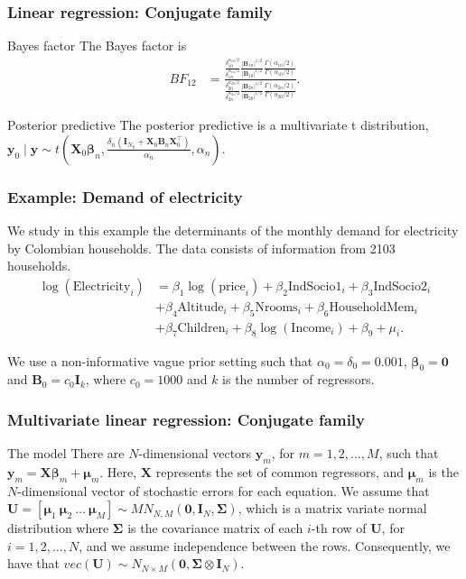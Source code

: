 \documentclass[12pt, compress]{beamer}
\begin{document}
\begin{frame}
	\frametitle{Linear regression: Conjugate family}
	\begin{block}{Bayes factor}
		The Bayes factor is
		\begin{align*}
			BF_{12}&=\frac{\frac{\delta_{10}^{\alpha_{10}/2}}{\delta_{1n}^{\alpha_{1n}/2}}\frac{|{\bm{B}}_{1n}|^{1/2}}{|{\bm{B}}_{10}|^{1/2}}\frac{\Gamma(\alpha_{1n}/2)}{\Gamma(\alpha_{10}/2)}}{\frac{\delta_{20}^{\alpha_{20}/2}}{\delta_{2n}^{\alpha_{2n}/2}}\frac{|{\bm{B}}_{2n}|^{1/2}}{|{\bm{B}}_{20}|^{1/2}}\frac{\Gamma(\alpha_{2n}/2)}{\Gamma(\alpha_{20}/2)}}.
		\end{align*}
	\end{block}
\begin{block}{Posterior predictive}
	The posterior predictive is a multivariate t distribution, ${\bm{y}}_0\mid {\bm{y}}\sim t\left({\bm{X}}_0\bm{\beta}_n,\frac{\delta_n({\bm{I}}_{N_0}+{\bm{X}}_0{\bm{B}}_n{\bm{X}}_0^{\top})}{\alpha_n},\alpha_n\right)$.
\end{block}

\end{frame}

\begin{frame}
	\frametitle{Example: Demand of electricity}
	
We study in this example the determinants of the monthly demand for electricity by Colombian households. The data consists of information from 2103 households.
\begin{align*}
	\log(\text{Electricity}_i) & = \beta_1\log(\text{price}_i) + \beta_2\text{IndSocio1}_i + \beta_3\text{IndSocio2}_i \\
	& + \beta_4\text{Altitude}_i + \beta_5\text{Nrooms}_i + \beta_6\text{HouseholdMem}_i\\
	& + \beta_7\text{Children}_i + \beta_8\log(\text{Income}_i) + \beta_9 + \mu_i.
\end{align*}

We use a non-informative vague prior setting such that $\alpha_0=\delta_0=0.001$, $\bm{\beta}_0=\bm{0}$ and $\bm{B}_0=c_0\bm{I}_k$, where $c_0=1000$ and $k$ is the number of regressors. 
\end{frame}

\begin{frame}
	\frametitle{Multivariate linear regression: Conjugate family}
	\begin{block}{The model}
		There are $N$-dimensional vectors ${\bm{y}}_m$, for $m = 1, 2, \dots, M$, such that ${\bm{y}}_m = {\bm{X}} \bm{\beta}_m + \bm{\mu}_m$. Here, ${\bm{X}}$ represents the set of common regressors, and $\bm{\mu}_m$ is the $N$-dimensional vector of stochastic errors for each equation. We assume that ${\bm{U}} = [\bm{\mu}_1 \ \bm{\mu}_2 \ \dots \ \bm{\mu}_M] \sim MN_{N,M}({\bm{0}}, {\bm{I}}_N, {\bm{\Sigma}})$, which is a matrix variate normal distribution where $\bm{\Sigma}$ is the covariance matrix of each $i$-th row of ${\bm{U}}$, for $i = 1, 2, \dots, N$, and we assume independence between the rows. Consequently, we have that $vec({\bm{U}}) \sim N_{N \times M}({\bm{0}}, \bm{\Sigma} \otimes {\bm{I}}_N)$.
	\end{block}

\end{frame}
\end{document}
